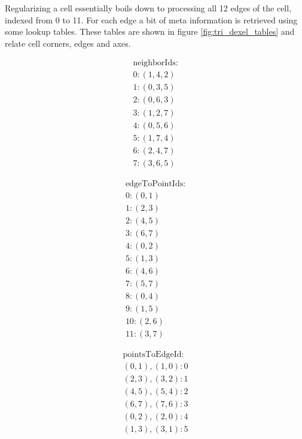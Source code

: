 %
Regularizing a cell essentially boils down to processing all 12 edges of the cell, indexed from 0 to 11.
For each edge a bit of meta information is retrieved using some lookup tables.
These tables are shown in figure \ref{fig:tri_dexel_tables} and relate cell corners, edges and axes.
%
\begin{figure}
	\begin{subfigure}[t]{0.24\textwidth}
		\begin{align*}
		\text{neighborIds:} \\
		0: (1, 4, 2) \\
		1: (0, 3, 5) \\
		2: (0, 6, 3) \\
		3: (1, 2, 7) \\
		4: (0, 5, 6) \\
		5: (1, 7, 4) \\
		6: (2, 4, 7) \\
		7: (3, 6, 5)
		\end{align*}
	\end{subfigure}
	\begin{subfigure}[t]{0.24\textwidth}
		\begin{align*}
		\text{edgeToPointIds:} \\
		 0: (0, 1) \\
		 1: (2, 3) \\
		 2: (4, 5) \\
		 3: (6, 7) \\
		 4: (0, 2) \\
		 5: (1, 3) \\
		 6: (4, 6) \\
		 7: (5, 7) \\
		 8: (0, 4) \\
		 9: (1, 5) \\
		10: (2, 6) \\
		11: (3, 7)
		\end{align*}
	\end{subfigure}
	\begin{subfigure}[t]{0.24\textwidth}
		\begin{align*}
		\text{pointsToEdgeId:} \\
		(0, 1), (1, 0):  0 \\
		(2, 3), (3, 2):  1 \\
		(4, 5), (5, 4):  2 \\
		(6, 7), (7, 6):  3 \\
		(0, 2), (2, 0):  4 \\
		(1, 3), (3, 1):  5 \\

\end{align*}
\end{subfigure}
\end{figure}
